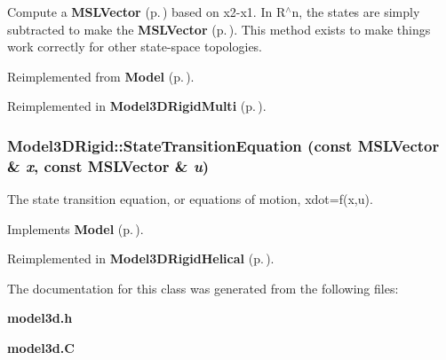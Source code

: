 Compute a {\bf MSLVector} {\rm (p.\,\pageref{classMSLVector})} based on x2-x1. In R$^\wedge$n, the states are simply subtracted to make the {\bf MSLVector} {\rm (p.\,\pageref{classMSLVector})}. This method exists to make things work correctly for other state-space topologies.



Reimplemented from {\bf Model} {\rm (p.\,\pageref{classModel_a7})}.

Reimplemented in {\bf Model3DRigid\-Multi} {\rm (p.\,\pageref{classModel3DRigidMulti_a5})}.
\subsubsection{ Model3DRigid::State\-Transition\-Equation (const {\bf MSLVector} \& {\em x}, const {\bf MSLVector} \& {\em u})\hspace{0.3cm}{\tt  [virtual]}}\label{classModel3DRigid_a3}


The state transition equation, or equations of motion, xdot=f(x,u).



Implements {\bf Model} {\rm (p.\,\pageref{classModel_a3})}.

Reimplemented in {\bf Model3DRigid\-Helical} {\rm (p.\,\pageref{classModel3DRigidHelical_a2})}.

The documentation for this class was generated from the following files:\begin{CompactItemize}
\item 
{\bf model3d.h}\item 
{\bf model3d.C}\end{CompactItemize}
